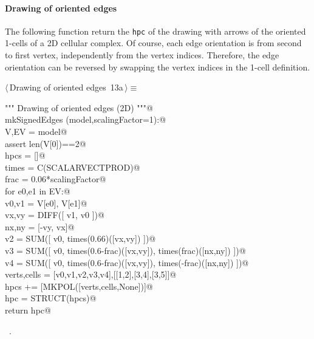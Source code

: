\documentclass[11pt,oneside]{article}	%
\begin{document}
\paragraph{Drawing of oriented edges}
The following function return the \texttt{hpc} of the drawing with arrows of the oriented 1-cells of a 2D cellular complex. Of course, each edge orientation is from second to first vertex, independently from the vertex indices. Therefore, the edge orientation can be reversed by swapping the vertex indices in the 1-cell definition. 
\begin{flushleft} \small \label{scrap24}
\protect{}$\langle\,$Drawing of oriented edges\nobreak\ {\footnotesize 13a}$\,\rangle\equiv$
\vspace{-1ex}
\begin{list}{}{} \item
\mbox{}\verb@""" Drawing of oriented edges (2D) """@\\
\mbox{}\verb@def mkSignedEdges (model,scalingFactor=1):@\\
\mbox{}\verb@   V,EV = model@\\
\mbox{}\verb@   assert len(V[0])==2@\\
\mbox{}\verb@   hpcs = []@\\
\mbox{}\verb@   times = C(SCALARVECTPROD)@\\
\mbox{}\verb@   frac = 0.06*scalingFactor@\\
\mbox{}\verb@   for e0,e1 in EV:@\\
\mbox{}\verb@      v0,v1 = V[e0], V[e1]@\\
\mbox{}\verb@      vx,vy = DIFF([ v1, v0 ])@\\
\mbox{}\verb@      nx,ny = [-vy, vx]@\\
\mbox{}\verb@      v2 = SUM([ v0, times(0.66)([vx,vy]) ])@\\
\mbox{}\verb@      v3 = SUM([ v0, times(0.6-frac)([vx,vy]), times(frac)([nx,ny]) ])@\\
\mbox{}\verb@      v4 = SUM([ v0, times(0.6-frac)([vx,vy]), times(-frac)([nx,ny]) ])@\\
\mbox{}\verb@      verts,cells = [v0,v1,v2,v3,v4],[[1,2],[3,4],[3,5]]@\\
\mbox{}\verb@      hpcs += [MKPOL([verts,cells,None])]@\\
\mbox{}\verb@   hpc = STRUCT(hpcs)@\\
\mbox{}\verb@   return hpc@\\
\mbox{}\verb@@{\NWsep}
\end{list}
\vspace{-1ex}
\footnotesize\addtolength{\baselineskip}{-1ex}
\begin{list}{}{\setlength{\itemsep}{-\parsep}\setlength{\itemindent}{-\leftmargin}}
\item \NWtxtMacroRefIn\ .
\end{list}
\end{flushleft}
\end{document}
